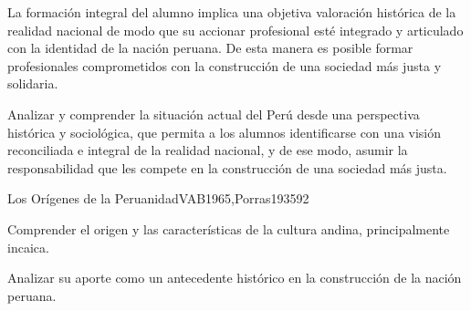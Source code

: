 \begin{syllabus}


\begin{justification}
La formación integral del alumno implica una objetiva valoración histórica de la 
realidad nacional de modo que su accionar profesional esté integrado y articulado 
con la identidad de la nación peruana. De esta manera es posible formar profesionales 
comprometidos con la construcción de una sociedad más justa y solidaria.
\end{justification}

\begin{goals}
\item Analizar y comprender la situación actual del Perú desde una perspectiva 
histórica y sociológica, que permita a los alumnos identificarse con una visión 
reconciliada e integral de la realidad nacional, y de ese modo, asumir la 
responsabilidad que les compete en la construcción de una sociedad más justa.
\end{goals}

\begin{outcomes}
\end{outcomes}

\begin{unit}{Los Orígenes de la Peruanidad}{VAB1965,Porras1935}{9}{2}
\begin{topics}
      \item 
\end{topics}
\begin{unitgoals}
      \item Comprender el origen y las características de la cultura andina, principalmente incaica.
      \item Analizar su aporte como un antecedente histórico en la construcción de la nación peruana.
\end{unitgoals}
\end{unit}


\end{syllabus}
